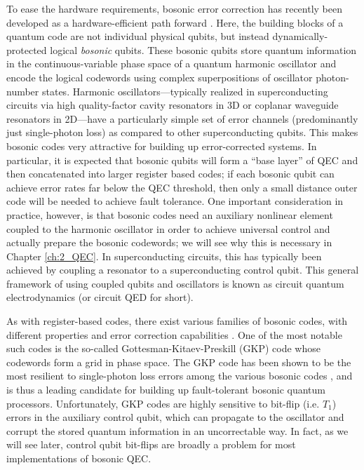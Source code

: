 To ease the hardware requirements, bosonic error correction has recently been developed as a hardware-efficient path forward \cite{terhal2020bosonic, cai2021bosonic, joshi2021bosonic}. Here, the building blocks of a quantum code are not individual physical qubits, but instead dynamically-protected logical \textit{bosonic} qubits. These bosonic qubits store quantum information in the continuous-variable phase space of a quantum harmonic oscillator and encode the logical codewords using complex superpositions of oscillator photon-number states. Harmonic oscillators---typically realized in superconducting circuits via high quality-factor cavity resonators in 3D or coplanar waveguide resonators in 2D---have a particularly simple set of error channels (predominantly just single-photon loss) as compared to other superconducting qubits. This makes bosonic codes very attractive for building up error-corrected systems. In particular, it is expected that bosonic qubits will form a ``base layer'' of QEC and then concatenated into larger register based codes; if each bosonic qubit can achieve error rates far below the QEC threshold, then only a small distance outer code will be needed to achieve fault tolerance. One important consideration in practice, however, is that bosonic codes need an auxiliary nonlinear element coupled to the harmonic oscillator in order to achieve universal control and actually prepare the bosonic codewords; we will see why this is necessary in Chapter \ref{ch:2_QEC}. In superconducting circuits, this has typically been achieved by coupling a resonator to a  superconducting control qubit. This general framework of using coupled qubits and oscillators is known as circuit quantum electrodynamics (or circuit QED for short). 

As with register-based codes, there exist various families of bosonic codes, with different properties and error correction capabilities \cite{joshi2021bosonic}. One of the most notable such codes is the so-called Gottesman-Kitaev-Preskill (GKP) code whose codewords form a grid in phase space. The GKP code has been shown to be the most resilient to single-photon loss errors among the various bosonic codes \cite{albert2018performance-and-structure, noh2018performance-and-structure-pt2}, and is thus a leading candidate for building up fault-tolerant bosonic quantum processors. Unfortunately, GKP codes are highly sensitive to bit-flip (i.e. $T_1$) errors in the auxiliary control qubit, which can propagate to the oscillator and corrupt the stored quantum information in an uncorrectable way. In fact, as we will see later, control qubit bit-flips are broadly a problem for most implementations of bosonic QEC. 


